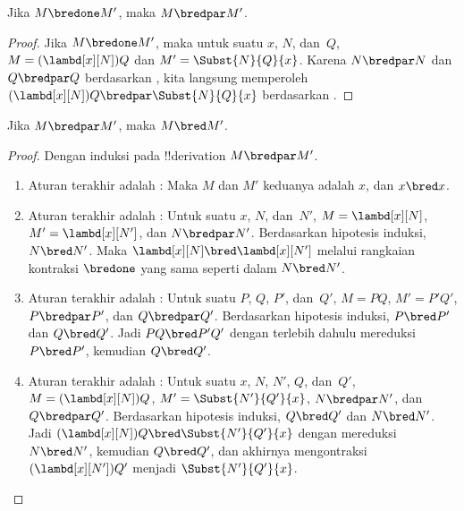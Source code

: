 \documentclass[../../../include/open-logic-section]{subfiles}
\begin{document}


\begin{lem}
  Jika $M \bredone M'$, maka $M \bredpar M'$.
\end{lem}
\begin{proof} Jika $M \bredone M'$, maka untuk suatu $x$, $N$, dan~$Q$,
    $M=(\lambd[x][N])Q$ dan $M'=\Subst{N}{Q}{x}$. Karena
    $N\bredpar N$ dan $Q\bredpar Q$ berdasarkan ,
    kita langsung memperoleh $(\lambd[x][N])Q
    \bredpar\Subst{N}{Q}{x}$ berdasarkan
    .
\end{proof}

\begin{lem}
  Jika $M \bredpar M'$, maka $M \bred M'$.
\end{lem}

\begin{proof} Dengan induksi pada !!{derivation} $M \bredpar M'$.
  \begin{enumerate}
  \item Aturan terakhir adalah : Maka $M$ dan $M'$
    keduanya adalah $x$, dan $x \bred x$.
  \item Aturan terakhir adalah : Untuk suatu $x$,
    $N$, dan~$N'$, $M=\lambd[x][N]$, $M'=\lambd[x][N']$, dan
    $N\bredpar N'$. Berdasarkan hipotesis induksi, $N\bred N'$. Maka
    $\lambd[x][N]\bred\lambd[x][N']$ melalui rangkaian kontraksi
    $\bredone$ yang sama seperti dalam $N\bred N'$.
  \item Aturan terakhir adalah : Untuk suatu $P$,
    $Q$, $P'$, dan~$Q'$, $M=PQ$, $M'=P'Q'$, $P\bredpar P'$, dan
    $Q\bredpar Q'$. Berdasarkan hipotesis induksi, $P\bred P'$ dan
    $Q\bred Q'$. Jadi $PQ\bred P'Q'$ dengan terlebih dahulu mereduksi
    $P\bred P'$, kemudian $Q\bred Q'$.
  \item Aturan terakhir adalah : Untuk suatu $x$,
    $N$, $N'$, $Q$, dan~$Q'$, $M=(\lambd[x][N])Q$,
    $M'=\Subst{N'}{Q'}{x}$, $N\bredpar N'$, dan $Q\bredpar Q'$.
    Berdasarkan hipotesis induksi, $Q\bred Q'$ dan $N\bred N'$. Jadi
    $(\lambd[x][N])Q\bred\Subst{N'}{Q'}{x}$ dengan mereduksi $N\bred N'$,
    kemudian $Q\bred Q'$, dan akhirnya mengontraksi
    $(\lambd[x][N'])Q'$ menjadi $\Subst{N'}{Q'}{x}$.
  \end{enumerate}
\end{proof}
\end{document}
